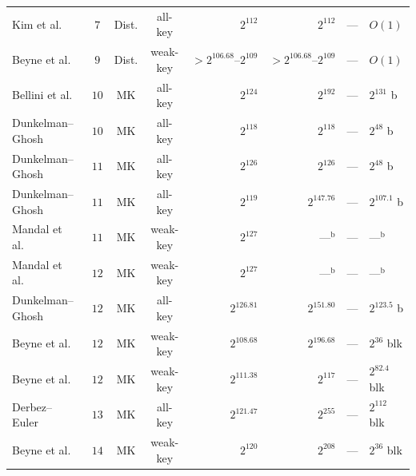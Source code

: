 \documentclass[11pt,a4paper]{article}
\theoremstyle{definition}
\theoremstyle{remark}
\begin{document}
\begin{table}[t!]
\begin{tabular}{@{}lcccrrrl@{}}
Kim et al.~\cite{KKL24}             & $7$           & Dist.        & all-key  & $2^{112}$                & $2^{112}$                  & ---           & $O(1)$ \\
Beyne et al.~\cite{BNS26}           & $9$           & Dist.        & weak-key & $>2^{106.68}\text{--}2^{109}$ & $>2^{106.68}\text{--}2^{109}$ & ---       & $O(1)$ \\
Bellini et al.~\cite{BRRT25}        & $10$          & MK           & all-key  & $2^{124}$                & $2^{192}$                  & ---           & $2^{131}$ b \\
Dunkelman--Ghosh~\cite{DG25}        & $10$          & MK           & all-key  & $2^{118}$                & $2^{118}$                  & ---           & $2^{48}$ b \\
Dunkelman--Ghosh~\cite{DG25}        & $11$          & MK           & all-key  & $2^{126}$                & $2^{126}$                  & ---           & $2^{48}$ b \\
Dunkelman--Ghosh~\cite{DG25}        & $11$          & MK           & all-key  & $2^{119}$                & $2^{147.76}$               & ---           & $2^{107.1}$ b \\
Mandal et al.~\cite{MMRS25}         & $11$          & MK           & weak-key & $2^{127}$                & ---$^{\mathrm{b}}$         & ---           & ---$^{\mathrm{b}}$ \\
Mandal et al.~\cite{MMRS25}         & $12$          & MK           & weak-key & $2^{127}$                & ---$^{\mathrm{b}}$         & ---           & ---$^{\mathrm{b}}$ \\
Dunkelman--Ghosh~\cite{DG25}        & $12$          & MK           & all-key  & $2^{126.81}$             & $2^{151.80}$               & ---           & $2^{123.5}$ b \\
Beyne et al.~\cite{BNS26}           & $12$          & MK           & weak-key & $2^{108.68}$             & $2^{196.68}$               & ---           & $2^{36}$ blk \\
Beyne et al.~\cite{BNS26}           & $12$          & MK           & weak-key & $2^{111.38}$             & $2^{117}$                  & ---           & $2^{82.4}$ blk \\
Derbez--Euler~\cite{DE25}           & $13$          & MK           & all-key  & $2^{121.47}$             & $2^{255}$                  & ---           & $2^{112}$ blk \\
Beyne et al.~\cite{BNS26}           & $14$          & MK           & weak-key & $2^{120}$                & $2^{208}$                  & ---           & $2^{36}$ blk \\

\end{tabular}
\end{table}
\end{document}
